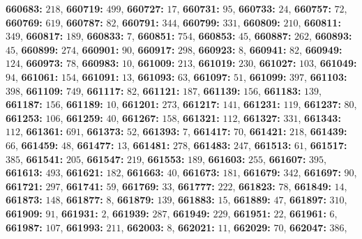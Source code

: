 \textsf{\bfseries 660683:} $218$, \textsf{\bfseries 660719:} $499$, \textsf{\bfseries 660727:} $17$, \textsf{\bfseries 660731:} $95$, \textsf{\bfseries 660733:} $24$, \textsf{\bfseries 660757:} $72$, \textsf{\bfseries 660769:} $619$, \textsf{\bfseries 660787:} $82$, \textsf{\bfseries 660791:} $344$, \textsf{\bfseries 660799:} $331$, \textsf{\bfseries 660809:} $210$, \textsf{\bfseries 660811:} $349$, \textsf{\bfseries 660817:} $189$, \textsf{\bfseries 660833:} $7$, \textsf{\bfseries 660851:} $754$, \textsf{\bfseries 660853:} $45$, \textsf{\bfseries 660887:} $262$, \textsf{\bfseries 660893:} $45$, \textsf{\bfseries 660899:} $274$, \textsf{\bfseries 660901:} $90$, \textsf{\bfseries 660917:} $298$, \textsf{\bfseries 660923:} $8$, \textsf{\bfseries 660941:} $82$, \textsf{\bfseries 660949:} $124$, \textsf{\bfseries 660973:} $78$, \textsf{\bfseries 660983:} $10$, \textsf{\bfseries 661009:} $213$, \textsf{\bfseries 661019:} $230$, \textsf{\bfseries 661027:} $103$, \textsf{\bfseries 661049:} $94$, \textsf{\bfseries 661061:} $154$, \textsf{\bfseries 661091:} $13$, \textsf{\bfseries 661093:} $63$, \textsf{\bfseries 661097:} $51$, \textsf{\bfseries 661099:} $397$, \textsf{\bfseries 661103:} $398$, \textsf{\bfseries 661109:} $749$, \textsf{\bfseries 661117:} $82$, \textsf{\bfseries 661121:} $187$, \textsf{\bfseries 661139:} $156$, \textsf{\bfseries 661183:} $139$, \textsf{\bfseries 661187:} $156$, \textsf{\bfseries 661189:} $10$, \textsf{\bfseries 661201:} $273$, \textsf{\bfseries 661217:} $141$, \textsf{\bfseries 661231:} $119$, \textsf{\bfseries 661237:} $80$, \textsf{\bfseries 661253:} $106$, \textsf{\bfseries 661259:} $40$, \textsf{\bfseries 661267:} $158$, \textsf{\bfseries 661321:} $112$, \textsf{\bfseries 661327:} $331$, \textsf{\bfseries 661343:} $112$, \textsf{\bfseries 661361:} $691$, \textsf{\bfseries 661373:} $52$, \textsf{\bfseries 661393:} $7$, \textsf{\bfseries 661417:} $70$, \textsf{\bfseries 661421:} $218$, \textsf{\bfseries 661439:} $66$, \textsf{\bfseries 661459:} $48$, \textsf{\bfseries 661477:} $13$, \textsf{\bfseries 661481:} $278$, \textsf{\bfseries 661483:} $247$, \textsf{\bfseries 661513:} $61$, \textsf{\bfseries 661517:} $385$, \textsf{\bfseries 661541:} $205$, \textsf{\bfseries 661547:} $219$, \textsf{\bfseries 661553:} $189$, \textsf{\bfseries 661603:} $255$, \textsf{\bfseries 661607:} $395$, \textsf{\bfseries 661613:} $493$, \textsf{\bfseries 661621:} $182$, \textsf{\bfseries 661663:} $40$, \textsf{\bfseries 661673:} $181$, \textsf{\bfseries 661679:} $342$, \textsf{\bfseries 661697:} $90$, \textsf{\bfseries 661721:} $297$, \textsf{\bfseries 661741:} $59$, \textsf{\bfseries 661769:} $33$, \textsf{\bfseries 661777:} $222$, \textsf{\bfseries 661823:} $78$, \textsf{\bfseries 661849:} $14$, \textsf{\bfseries 661873:} $148$, \textsf{\bfseries 661877:} $8$, \textsf{\bfseries 661879:} $139$, \textsf{\bfseries 661883:} $15$, \textsf{\bfseries 661889:} $47$, \textsf{\bfseries 661897:} $310$, \textsf{\bfseries 661909:} $91$, \textsf{\bfseries 661931:} $2$, \textsf{\bfseries 661939:} $287$, \textsf{\bfseries 661949:} $229$, \textsf{\bfseries 661951:} $22$, \textsf{\bfseries 661961:} $6$, \textsf{\bfseries 661987:} $107$, \textsf{\bfseries 661993:} $211$, \textsf{\bfseries 662003:} $8$, \textsf{\bfseries 662021:} $11$, \textsf{\bfseries 662029:} $70$, \textsf{\bfseries 662047:} $386$, 
